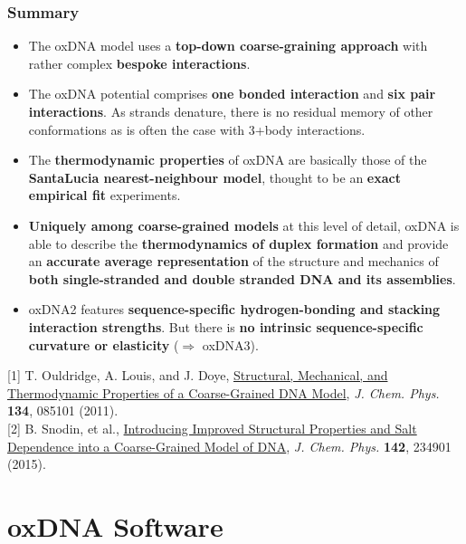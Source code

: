 \documentclass[slidestop,compress,9pt]{beamer}
\begin{document}
\begin{frame}
\frametitle{Summary}
\vspace*{0.25cm}
\small
\begin{itemize}
\setlength\itemsep{5pt}
\item The oxDNA model uses a \textbf{top-down coarse-graining approach} with rather complex \textbf{bespoke interactions}.
\item The oxDNA potential comprises \textbf{one bonded interaction} and \textbf{six pair interactions}. As strands denature, there is no residual memory of other conformations as is often the case with 3+body interactions.
\item The \textbf{thermodynamic properties} of oxDNA are basically those of the \textbf{SantaLucia nearest-neighbour model}, thought to be an \textbf{exact empirical fit} experiments. 
\item \textbf{Uniquely among coarse-grained  models} at this level of detail, oxDNA is able to describe the \textbf{thermodynamics of duplex formation} and provide an \textbf{accurate average representation} of the structure and mechanics of \textbf{both single-stranded and double stranded DNA and its assemblies}.
\item oxDNA2 features \textbf{sequence-specific hydrogen-bonding and stacking interaction strengths}. But there is \textbf{no intrinsic sequence-specific curvature or elasticity} ($\Rightarrow$ oxDNA3).  
\end{itemize}
\vspace*{0.25cm}
[1] T. Ouldridge, A. Louis, and J. Doye, \href{https://doi.org/10.1063/1.3552946}{Structural, Mechanical, and Thermodynamic Properties of a Coarse-Grained DNA Model}, \textit{J. Chem. Phys.} \textbf{134}, 085101 (2011).\\[7pt]
[2] B. Snodin, et al., \href{https://doi.org/10.1063/1.4921957}{Introducing Improved Structural Properties and Salt Dependence into a Coarse-Grained Model of DNA}, \textit{J. Chem. Phys.}  \textbf{142}, 234901 (2015).

\end{frame}


\section{oxDNA Software}
\end{document}
